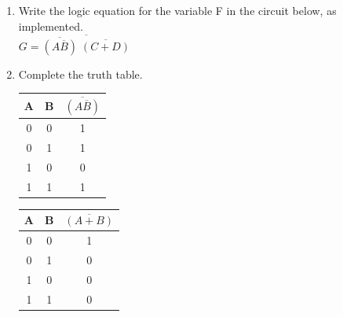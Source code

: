 \documentclass[12pt,letterpaper,titlepage]{report}
\begin{document}
\begin{enumerate}[label=\alph*)]
	\item Write the logic equation for the variable F in the circuit below, as implemented. \\
	$ G = \overline{\overline{(A\overline{B})}\;\overline{(C + D)}}$
	\item Complete the truth table. 
	\begin{paracol}{3}     
	\switchcolumn
	\def\arraystretch{1.5} 
	\begin{tabular}{|c c|c|}               \hline
	A & B & $\overline{(A\overline{B})}$ \\\hline
	0 & 0 & 1                            \\\hline
	0 & 1 & 1                            \\\hline
	1 & 0 & 0                            \\\hline
	1 & 1 & 1                            \\\hline
	\end{tabular}\medskip
	
	\begin{tabular}{|c c|c|}       \hline
	A & B & $\overline{(A + B)}$ \\\hline
	0 & 0 & 1                     \\\hline
	0 & 1 & 0                     \\\hline
	1 & 0 & 0                     \\\hline
	1 & 1 & 0                     \\\hline
	\end{tabular}	


\end{paracol}
\end{enumerate}
\end{document}
